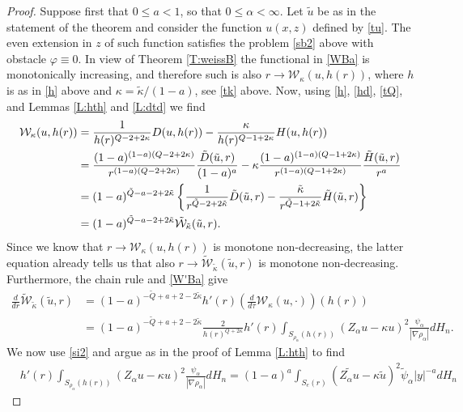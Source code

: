 \documentclass[11pt]{amsart}
\theoremstyle{plain}
\numberwithin{equation}{section}
\begin{document}
\begin{proof}
Suppose first that $0\le a<1$, so that $0\le \alpha <\infty$. Let $\tilde u$ be as in the statement of the theorem and consider the function $u(x,z)$ defined by \eqref{tu}. The even extension in $z$ of such function satisfies the problem \eqref{sb2} above with obstacle ${\varphi} \equiv 0$. In view of Theorem \ref{T:weissB}
the functional in \eqref{WBa} is monotonically increasing, and therefore such is also $r\to  \mathcal{W}_\kappa(u,h(r))$, where $h$ is as in \eqref{h} above and $\kappa = \tilde \kappa/(1-a)$, see \eqref{tk} above. Now, using \eqref{h}, \eqref{hd}, \eqref{tQ}, and Lemmas \ref{L:hth} and \ref{L:dtd} we find
\begin{align}\label{Ws}
\mathcal{W}_\kappa(u,h(r)) & =\frac{1}{h(r)^{Q-2+2\kappa}} D(u,h(r)) -\frac{\kappa}{h(r)^{Q-1+2\kappa}}H(u,h(r))
\\
& = \frac{(1-a)^{(1-a)(Q-2+2\kappa)}}{r^{(1-a)(Q-2+2\kappa)}} \frac{\tilde D(\tilde u,r)}{(1-a)^{a}} -  \kappa \frac{(1-a)^{(1-a)(Q-1+2\kappa)}}{r^{(1-a)(Q-1+2\kappa)}}\frac{\tilde H(\tilde u,r)}{r^a}
\notag\\
& = (1-a)^{\tilde Q-a -2+2\tilde \kappa}\left\{ \frac{1}{r^{\tilde Q-2+2\tilde \kappa}} \tilde D(\tilde u,r) - \frac{\tilde \kappa}{r^{\tilde Q-1+2\tilde \kappa}} \tilde H(\tilde u,r)\right\}
\notag\\
& = (1-a)^{\tilde Q-a -2+2\tilde \kappa} \tilde{\mathcal W}_{\tilde \kappa}(\tilde u,r).
\notag
\end{align}
Since we know that $r\to \mathcal W_\kappa(u,h(r))$ is monotone non-decreasing, the latter equation already tells us that also $r\to \tilde{\mathcal W}_{\tilde \kappa}(\tilde u,r)$ is monotone non-decreasing. Furthermore, the chain rule and \eqref{W'Ba} give
\begin{align*}
\frac{d}{dr} \tilde{\mathcal W}_{\tilde \kappa}(\tilde u,r) & = (1-a)^{-\tilde Q+a +2-2\tilde \kappa} h'(r) \left(\frac{d}{d\tau}\mathcal{W}_\kappa(u,\cdot)\right)(h(r))
\\
& = (1-a)^{-\tilde Q+a +2-2\tilde \kappa} \frac{2}{h(r)^{Q+2\kappa}} h'(r)  \int_{{S_{\rho_\alpha}(h(r))}}(Z_\alpha u-\kappa u)^2\frac{\psi_\alpha}{|\nabla {\rho_\alpha}|}dH_{n}.
 \end{align*}
 We now use \eqref{si2} and argue as in the proof of Lemma \ref{L:hth} to find
 \begin{align*}
& h'(r)  \int_{{S_{\rho_\alpha}(h(r))}}(Z_\alpha u-\kappa u)^2\frac{\psi_\alpha}{|\nabla {\rho_\alpha}|}dH_{n} =
(1-a)^a \int_{{S_{e}(r)}}(\widetilde{Z_\alpha u} -\kappa \tilde u)^2 \tilde \psi_\alpha |y|^{-a} dH_{n}

\end{align*}
\end{proof}
\end{document}
